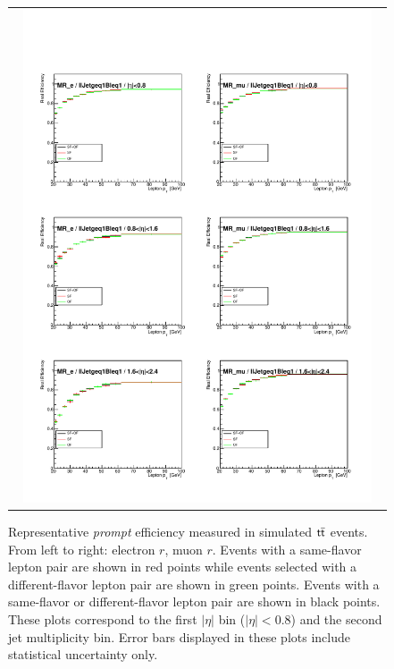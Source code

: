 \begin{figure}[tbh!]
 \begin{center}
 \begin{tabular}{c}
 \includegraphics[width=0.95\textwidth]{figures/Part3/Nonprompt/MR/real_eff}
 \end{tabular}
 \caption{Representative \emph{prompt} efficiency measured in simulated $\textsf{t}\overline{\textsf{t}}$ events. From left to right: electron $r$, muon $r$. Events with a same-flavor lepton pair are shown in red points while events selected with a different-flavor lepton pair are shown in green points. Events with a same-flavor or different-flavor lepton pair are shown in black points. These plots correspond to the first $|\eta|$ bin ($|\eta|<$0.8) and the second jet multiplicity bin. Error bars displayed in these plots include statistical uncertainty only. }
 \label{fig:real_eff}
 \end{center}
\end{figure}

